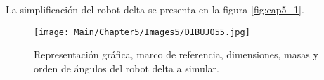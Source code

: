     \newpage
    
     La simplificación del robot delta se presenta en la figura \eqref{fig:cap5_1}.
    
    \begin{figure}[htb]
        \centering
        \texttt{[image: Main/Chapter5/Images5/DIBUJO55.jpg]}
        \caption{Representación gráfica, marco de referencia, dimensiones, masas y orden de ángulos del robot delta a simular.}
        \label{fig:cap5_1}
    \end{figure}
    
    
    